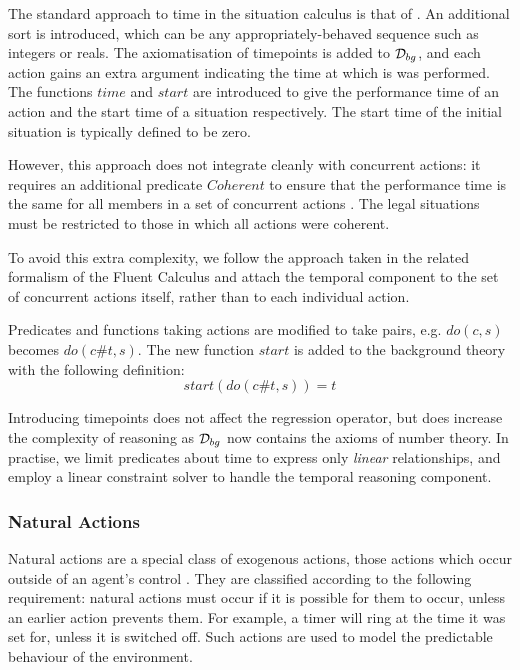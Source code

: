 The standard approach to time in the situation calculus is that of
\citep{pinto94temporal,reiter96sc_nat_conc}. An additional sort 
is introduced, which can be any appropriately-behaved sequence such
as integers or reals. The axiomatisation of timepoints is added to
$\mathcal{D}_{bg}$, and each action gains an extra argument indicating the
time at which is was performed. The functions $time$ and $start$
are introduced to give the performance time of an action and the start
time of a situation respectively. The start time of the initial situation
is typically defined to be zero.

However, this approach does not integrate cleanly with concurrent
actions: it requires an additional predicate $Coherent$ to ensure
that the performance time is the same for all members in a set of
concurrent actions \citep{reiter96sc_nat_conc}. The legal situations
must be restricted to those in which all actions were coherent.

To avoid this extra complexity, we follow the approach taken in the
related formalism of the Fluent Calculus \citep{martin03conc_flux}
and attach the temporal component to the set of concurrent actions
itself, rather than to each individual action.

Predicates and functions taking actions are modified to take pairs, e.g. $do(c,s)$ becomes $do(c\#t,s)$. The new function $start$
is added to the background theory with the following definition:\[
start(do(c\#t,s))=t\]


Introducing timepoints does not affect the regression operator, but
does increase the complexity of reasoning as $\mathcal{D}_{bg}$ now contains
the axioms of number theory. In practise, we limit predicates about
time to express only \emph{linear} relationships, and employ a linear
constraint solver to handle the temporal reasoning component.


\subsubsection{Natural Actions\label{sub:Background:Natural-Actions}}

Natural actions are a special class of exogenous actions, those actions
which occur outside of an agent's control \citep{reiter96sc_nat_conc}.
They are classified according to the following requirement: natural
actions must occur if it is possible for them to occur, unless an
earlier action prevents them. For example, a timer will ring at the
time it was set for, unless it is switched off. Such actions are used
to model the predictable behaviour of the environment.

